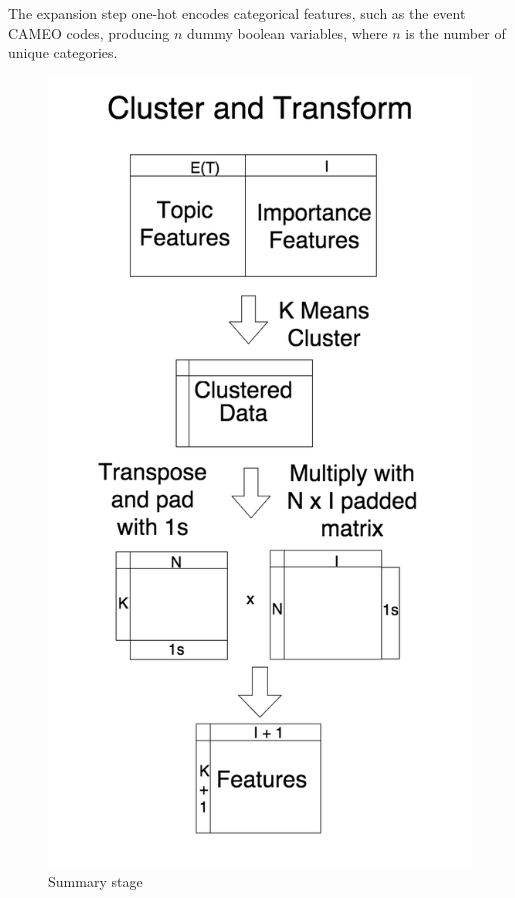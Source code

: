 The expansion step one-hot encodes categorical features, such as the event CAMEO codes,  producing $n$ dummy boolean variables, where $n$ is the number of unique categories.


\begin{figure}[ht]
\vskip 0.2in
\begin{center}
\centerline{\includegraphics[scale=0.15]{images/cluster_and_transform_vertical.png}}
\caption{Summary stage}
\end{center}
\vskip -0.2in
\label{fig:summarization}
\end{figure}

